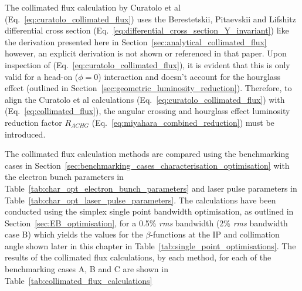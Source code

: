 \documentclass[../main.tex]{subfiles}
\begin{document}
The collimated flux calculation by Curatolo et al \cite{curatolo2017analytical} (Eq.~\ref{eq:curatolo_collimated_flux}) uses the Berestetskii, Pitaevskii and Lifshitz \cite{berestetskii1982quantum} differential cross section (Eq.~\ref{eq:differential_cross_section_Y_invariant}) like the derivation presented here in Section~\ref{sec:analytical_collimated_flux} however, an explicit derivation is not shown or referenced in that paper. Upon inspection of (Eq.~\ref{eq:curatolo_collimated_flux}), it is evident that this is only valid for a head-on ($\phi=0$) interaction and doesn't account for the  hourglass effect \cite{furman1991hourglass,miyahara2008luminosity} (outlined in Section~\ref{sec:geometric_luminosity_reduction}). Therefore, to align the Curatolo et al calculations (Eq.~\ref{eq:curatolo_collimated_flux}) with (Eq.~\ref{eq:collimated_flux}), the angular crossing and hourglass effect luminosity reduction factor $R_{ACHG}$ \cite{miyahara2008luminosity} (Eq.~\ref{eq:miyahara_combined_reduction}) must be introduced.

The collimated flux calculation methods are compared using the benchmarking cases in Section~\ref{sec:benchmarking_cases_characterisation_optimisation} with the electron bunch parameters in Table~\ref{tab:char_opt_electron_bunch_parameters} and laser pulse parameters in Table~\ref{tab:char_opt_laser_pulse_parameters}. The calculations have been conducted using the simplex single point bandwidth optimisation, as outlined in Section~\ref{sec:EB_optimisation}, for a 0.5\% \textit{rms} bandwidth (2\% \textit{rms} bandwidth case B) which yields the values for the $\beta$-functions at the IP and collimation angle shown later in this chapter in Table~\ref{tab:single_point_optimisations}. The results of the collimated flux calculations, by each method, for each of the benchmarking cases A, B and C are shown in Table~\ref{tab:collimated_flux_calculations}
\end{document}
